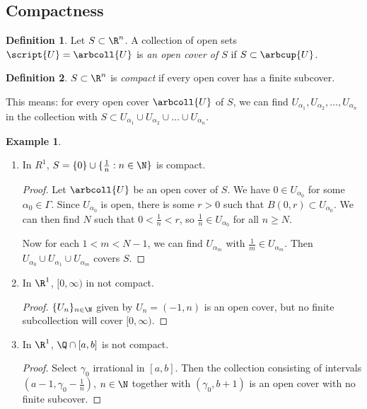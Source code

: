 \documentclass[a5paper]{article}
\theoremstyle{definition}%
\newtheorem*{definition*}{Definition}
\newtheorem*{example*}{Example}
\numberwithin{exercise}{section}
\theoremstyle{remark}%
\begin{document}
\subsection{Compactness}

\begin{highlight}
\begin{definition*}
Let $S\subset\R^n$. A collection of open sets $\script{U}=\arbcoll{U}$ is \emph{an open cover of $S$} if $S\subset \arbcup{U}$. 
\end{definition*}
\end{highlight}

\begin{highlight}
\begin{definition*}
$S\subset\R^n$ is \emph{compact} if every open cover has a finite subcover. 
\end{definition*}
\end{highlight}

This means: for every open cover $\arbcoll{U}$ of $S$, we can find $U_{\alpha_1}, U_{\alpha_2}, \ldots, U_{\alpha_n}$ in the collection with $S\subset U_{\alpha_1}\cup U_{\alpha_2}\cup \ldots\cup U_{\alpha_n}$.

\begin{example*}\mbox{}
\begin{enumerate}
\item In $R^1$, $S=\{0\}\cup\{\frac{1}{n}:n\in\N\}$ is compact.
\begin{proof}
Let $\arbcoll{U}$ be an open cover of $S$. We have $0\in U_{\alpha_0}$ for some $\alpha_0\in\Gamma$. Since $U_{\alpha_0}$ is open, there is some $r>0$ such that $B(0,r)\subset U_{\alpha_0}$. We can then find $N$ such that $0<\frac{1}{n}<r$, so $\frac{1}{n}\in U_{\alpha_0}$ for all $n\geq N$. 

Now for each $1<m<N-1$, we can find $U_{\alpha_m}$ with $\frac{1}{m}\in U_{\alpha_m}$. Then $U_{\alpha_0}\cup U_{\alpha_1}\cup U_{\alpha_m}$ covers $S$. 
\end{proof}

\item In $\R^1$, $[0,\infty)$ in not compact. 
\begin{proof}
$\{U_n\}_{n\in\N}$ given by $U_n=(-1,n)$ is an open cover, but no finite subcollection will cover $[0,\infty)$. 
\end{proof}

\item In $\R^1$, $\Q\cap[a,b]$ is not compact. 
\begin{proof}
Select $\gamma_0$ irrational in $[a,b]$. Then the collection consisting of intervals $(a-1,\gamma_0-\frac{1}{n})$, $n\in\N$ together with $(\gamma_0, b+1)$ is an open cover with no finite subcover. 
\end{proof}
\end{enumerate}
\end{example*}
\end{document}

